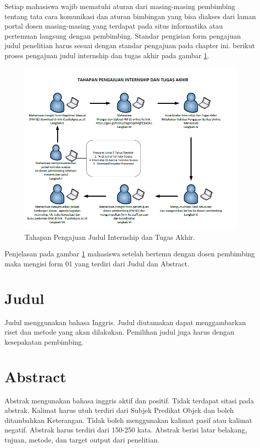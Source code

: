 Setiap mahasiswa wajib mematuhi aturan dari masing-masing pembimbing tentang tata cara komunikasi dan aturan bimbingan yang bisa diakses dari laman portal dosen masing-masing yang terdapat pada situs informatika atau pertemuan langsung dengan pembimbing. Standar pengisian form pengajuan judul penelitian harus sesuai dengan standar pengajuan pada chapter ini. berikut proses pengajuan judul internship dan tugas akhir pada gambar \ref{figure:P1}.
\begin{figure}[ht]
	\centerline{\includegraphics[width=1\textwidth]{figures/pengajuan.png}}
	\caption{Tahapan Pengajuan Judul Internship dan Tugas Akhir.}
	\label{figure:P1}
	\end{figure}


Penjelasan pada gambar  \ref{figure:P1} mahasiswa setelah bertemu dengan dosen pembimbing maka mengisi form 01 yang terdiri dari Judul dan Abstract.
\section{Judul}
Judul menggunakan bahasa Inggris. Judul diutamakan dapat menggambarkan riset dan metode yang akan dilakukan. Pemilihan judul juga harus dengan kesepakatan pembimbing. 

\section{Abstract}
Abstrak mengunakan bahasa inggris aktif dan positif. Tidak terdapat sitasi pada abstrak. Kalimat harus utuh terdiri dari Subjek Predikat Objek dan boleh ditambahkan Keterangan. Tidak boleh menggunakan kalimat pasif atau kalimat negatif. Abstrak harus terdiri dari 150-250 kata. Abstrak berisi latar belakang, tujuan, metode, dan target output dari penelitian.

